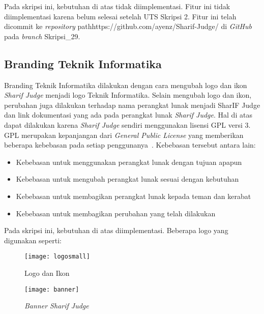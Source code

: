 Pada skripsi ini, kebutuhan di atas tidak diimplementasi. Fitur ini tidak diimplementasi karena belum selesai setelah UTS Skripsi 2. Fitur ini telah dicommit ke \textit{repository} path{https://github.com/ayenz/Sharif-Judge/} di \textit{GitHub} pada \textit{branch} Skripsi\_29.

\subsection{Branding Teknik Informatika}
Branding Teknik Informatika dilakukan dengan cara mengubah logo dan ikon \textit{Sharif Judge} menjadi logo Teknik Informatika. Selain mengubah logo dan ikon, perubahan juga dilakukan terhadap nama perangkat lunak menjadi SharIF Judge dan link dokumentasi yang ada pada perangkat lunak \textit{Sharif Judge}. Hal di atas dapat dilakukan karena \textit{Sharif Judge} sendiri menggunakan lisensi GPL versi 3. GPL merupakan kepanjangan dari \textit{General Public License} yang memberikan beberapa kebebasan pada setiap penggunanya~\cite{brett:09:moss}.
Kebebasan tersebut antara lain:
	\begin{itemize}
		\item Kebebasan untuk menggunakan perangkat lunak dengan tujuan apapun \\
		\item Kebebasan untuk mengubah perangkat lunak sesuai dengan kebutuhan \\
		\item Kebebasan untuk membagikan perangkat lunak kepada teman dan kerabat \\
		\item Kebebasan untuk membagikan perubahan yang telah dilakukan
	\end{itemize}
Pada skripsi ini, kebutuhan di atas diimplementasi. Beberapa logo yang digunakan seperti:

\begin{figure}[H]
	\centering  
	\texttt{[image: logosmall]}  
	\caption[Logo dan Ikon]{Logo dan Ikon} 
	\label{fig:logosmall} 
\end{figure} 

\begin{figure}[H]
	\centering  
	\texttt{[image: banner]}  
	\caption[\textit{Banner Sharif Judge}]{\textit{Banner Sharif Judge}} 
	\label{fig:banner} 
\end{figure} 

